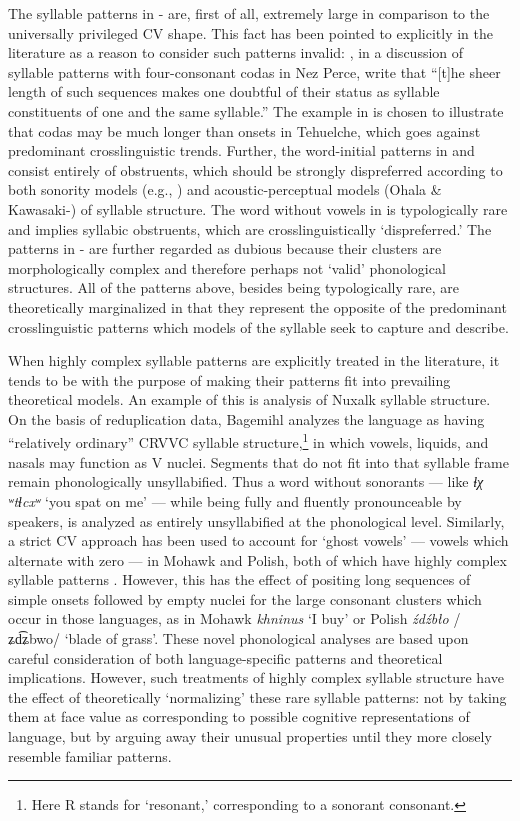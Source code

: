  The syllable patterns in - are, first of all, extremely large in comparison to the universally privileged CV shape. This fact has been pointed to explicitly in the literature as a reason to consider such patterns invalid: \citet[195]{KayeEtAl1990}, in a discussion of syllable patterns with four-consonant codas in Nez Perce, write that “[t]he sheer length of such sequences makes one doubtful of their status as syllable constituents of one and the same syllable.” The example in  is chosen to illustrate that codas may be much longer than onsets in Tehuelche, which goes against predominant crosslinguistic trends. Further, the word-initial patterns in  and  consist entirely of obstruents, which should be strongly dispreferred according to both sonority models (e.g., \citealt{Clements1990}) and acoustic-perceptual models (Ohala \& Kawasaki-\citealt{Fukumori1997}) of syllable structure. The word without vowels in  is typologically rare and implies syllabic obstruents, which are crosslinguistically ‘dispreferred.’ The patterns in - are further regarded as dubious because their clusters are morphologically complex and therefore perhaps not ‘valid’ phonological structures. All of the patterns above, besides being typologically rare, are theoretically marginalized in that they represent the opposite of the predominant crosslinguistic patterns which models of the syllable seek to capture and describe.

  When highly complex syllable patterns are explicitly treated in the literature, it tends to be with the purpose of making their patterns fit into prevailing theoretical models. An example of this is  analysis of Nuxalk syllable structure. On the basis of reduplication data, Bagemihl analyzes the language as having “relatively ordinary” CRVVC syllable structure,\footnote{ \textrm{Here R stands for ‘resonant,’ corresponding to a sonorant consonant.}} in which vowels, liquids, and nasals may function as V nuclei. Segments that do not fit into that syllable frame remain phonologically unsyllabified. Thus a word without sonorants — like \textit{ɬχ} \textit{ʷtɬcxʷ} ‘you spat on me’ — while being fully and fluently pronounceable by speakers, is analyzed as entirely unsyllabified at the phonological level. Similarly, a strict CV approach has been used to account for ‘ghost vowels’ — vowels which alternate with zero — in Mohawk and Polish, both of which have highly complex syllable patterns \citep{Rowicka1999}. However, this has the effect of positing long sequences of simple onsets followed by empty nuclei for the large consonant clusters which occur in those languages, as in Mohawk \textit{khninus} ‘I buy’ or Polish \textit{źdźbło} /ʑd͡ʑbwo/ ‘blade of grass’. These novel phonological analyses are based upon careful consideration of both language-specific patterns and theoretical implications. However, such treatments of highly complex syllable structure have the effect of theoretically ‘normalizing’ these rare syllable patterns: not by taking them at face value as corresponding to possible cognitive representations of language, but by arguing away their unusual properties until they more closely resemble familiar patterns.

